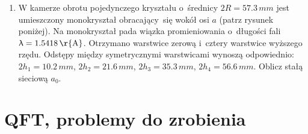 \documentclass[a4paper,11pt]{article}
\begin{document}
\begin{enumerate}
\item W kamerze obrotu pojedynczego kryształu o~średnicy
  $2R = 57.3 \, \si{mm}$ jest umieszczony monokryształ obracający~się
  wokół osi $a$ (patrz rysunek poniżej). Na monokryształ pada wiązka
  promieniowania o~długości fali $\lambda = 1.5418 \, \si{\r{A}}$. Otrzymano
  warstwice zerową i~cztery warstwice wyższego rzędu. Odstępy między
  symetrycznymi warstwicami wynoszą odpowiednio:
  $2 h_{ 1 } = 10.2 \, \si{mm}$, $2 h_{ 2 } = 21.6 \, \si{mm}$,
  $2 h_{ 3 } = 35.3 \, \si{mm}$, $2 h_{ 4 } = 56.6 \, \si{mm}$. Oblicz
  stałą sieciową $a_{ 0 }$.











\end{enumerate}










\section{QFT, problemy do zrobienia}


\end{document}
